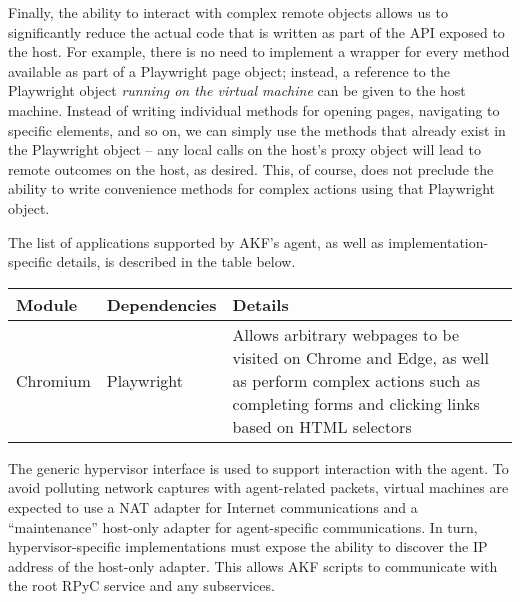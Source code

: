 Finally, the ability to interact with complex remote objects allows us
to significantly reduce the actual code that is written as part of the
API exposed to the host. For example, there is no need to implement a
wrapper for every method available as part of a Playwright page object;
instead, a reference to the Playwright object \emph{running on the
virtual machine} can be given to the host machine. Instead of writing
individual methods for opening pages, navigating to specific elements,
and so on, we can simply use the methods that already exist in the
Playwright object -- any local calls on the host's proxy object will
lead to remote outcomes on the host, as desired. This, of course, does
not preclude the ability to write convenience methods for complex
actions using that Playwright object.

The list of applications supported by AKF's agent, as well as
implementation-specific details, is described in the table below.

\begin{longtable}[]{@{}
  >{\raggedright\arraybackslash}p{}
  >{\raggedright\arraybackslash}p{}
  >{\raggedright\arraybackslash}p{}@{}}
\toprule\noalign{}
\begin{minipage}[b]{\linewidth}\raggedright
Module
\end{minipage} & \begin{minipage}[b]{\linewidth}\raggedright
Dependencies
\end{minipage} & \begin{minipage}[b]{\linewidth}\raggedright
Details
\end{minipage} \\
\midrule\noalign{}
\endhead
\bottomrule\noalign{}
\endlastfoot
Chromium & Playwright \cite{MicrosoftPlaywrightpython2025} & Allows
arbitrary webpages to be visited on Chrome and Edge, as well as perform
complex actions such as completing forms and clicking links based on
HTML selectors \\
\end{longtable}

The generic hypervisor interface is used to support interaction with the
agent. To avoid polluting network captures with agent-related packets,
virtual machines are expected to use a NAT adapter for Internet
communications and a ``maintenance'' host-only adapter for
agent-specific communications. In turn, hypervisor-specific
implementations must expose the ability to discover the IP address of
the host-only adapter. This allows AKF scripts to communicate with the
root RPyC service and any subservices.

